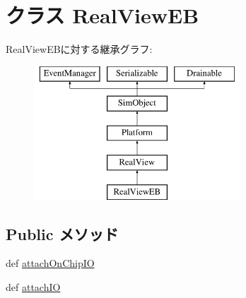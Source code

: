\hypertarget{classRealView_1_1RealViewEB}{
\section{クラス RealViewEB}
\label{classRealView_1_1RealViewEB}
}
RealViewEBに対する継承グラフ:\begin{figure}[H]
\begin{center}
\leavevmode
\includegraphics[height=5cm]{classRealView_1_1RealViewEB}
\end{center}
\end{figure}
\subsection*{Public メソッド}
\begin{DoxyCompactItemize}
\item 
def \hyperlink{classRealView_1_1RealViewEB_abd74cec934f25d2881d5fdd0d5e7f512}{attachOnChipIO}
\item 
def \hyperlink{classRealView_1_1RealViewEB_ac750675f6d6de3ad52f8c5b03ee45a65}{attachIO}
\end{DoxyCompactItemize}
